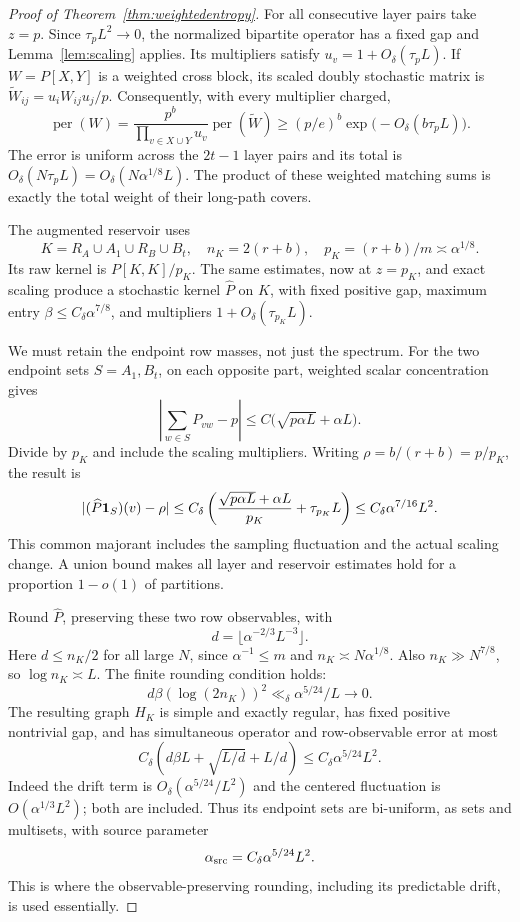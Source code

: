 \begin{proof}[Proof of Theorem~\ref{thm:weightedentropy}]
For all consecutive layer pairs take \(z=p\).
Since \(\tau_p L^2\to0\), the normalized bipartite operator
has a fixed gap and Lemma~\ref{lem:scaling} applies.
Its multipliers satisfy \(u_v=1+O_\delta(\tau_pL)\).
If \(W=P[X,Y]\) is a weighted cross block, its scaled
doubly stochastic matrix is
\(\widetilde W_{ij}=u_iW_{ij}u_j/p\).
Consequently, with every multiplier charged,
\[
 \operatorname{per}(W)
  =\frac{p^b}{\prod_{v\in X\cup Y}u_v}
                      \operatorname{per}(\widetilde W)
  \geq (p/e)^b
                  \exp\bigl(-O_\delta(b\tau_pL)\bigr).
\]
The error is uniform across the \(2t-1\) layer pairs and
its total is \(O_\delta(N\tau_pL)
=O_\delta(N\alpha^{1/8}L)\).
The product of these weighted matching sums is exactly
the total weight of their long-path covers.

The augmented reservoir uses
\[
 K=R_A\cup A_1\cup R_B\cup B_t,\quad
 n_K=2(r+b),\quad p_K=(r+b)/m\asymp\alpha^{1/8}.
\]
Its raw kernel is \(P[K,K]/p_K\).
The same estimates, now at \(z=p_K\), and exact scaling
produce a stochastic kernel \(\widehat P\) on \(K\), with
fixed positive gap, maximum entry
\(\beta\leq C_\delta\alpha^{7/8}\), and multipliers
\(1+O_\delta(\tau_{p_K}L)\).

We must retain the endpoint row masses, not just the spectrum.
For the two endpoint sets \(S=A_1,B_t\), on each opposite
part, weighted scalar concentration gives
\[
 \left|\sum_{w\in S}P_{vw}-p\right|
       \leq C\bigl(\sqrt{p\alpha L}+\alpha L\bigr).
\]
Divide by \(p_K\) and include the scaling multipliers.
Writing \(\rho=b/(r+b)=p/p_K\), the result is
\[
 |(\widehat P\mathbf1_S)(v)-\rho|
 \leq C_\delta\left(
       \frac{\sqrt{p\alpha L}+\alpha L}{p_K}
                               +\tau_{p_K}L\right)
 \leq C_\delta\alpha^{7/16}L^2.
\]
This common majorant includes the sampling fluctuation
and the actual scaling change.
A union bound makes all layer and reservoir estimates
hold for a proportion \(1-o(1)\) of partitions.

Round \(\widehat P\), preserving these two row observables,
with
\[
 d=\lfloor\alpha^{-2/3}L^{-3}\rfloor.
\]
Here \(d\leq n_K/2\) for all large \(N\), since
\(\alpha^{-1}\leq m\) and \(n_K\asymp N\alpha^{1/8}\).
Also \(n_K\gg N^{7/8}\), so \(\log n_K\asymp L\).
The finite rounding condition holds:
\[
 d\beta(\log(2n_K))^2
           \ll_\delta\alpha^{5/24}/L\longrightarrow0.
\]
The resulting graph \(H_K\) is simple and exactly regular,
has fixed positive nontrivial gap, and has simultaneous
operator and row-observable error at most
\[
 C_\delta\left(d\beta L+\sqrt{L/d}+L/d\right)
                   \leq C_\delta\alpha^{5/24}L^2.
\]
Indeed the drift term is \(O_\delta(\alpha^{5/24}/L^2)\)
and the centered fluctuation is \(O(\alpha^{1/3}L^2)\);
both are included.
Thus its endpoint sets are bi-uniform, as sets and multisets,
with source parameter
\[
 \alpha_{\rm src}=C_\delta\alpha^{5/24}L^2.
\]
This is where the observable-preserving rounding, including
its predictable drift, is used essentially.


\end{proof}
